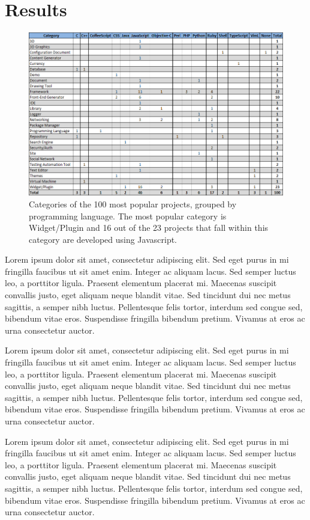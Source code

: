 
\section{Results}
\label{sec:results}
\begin{figure}[ht]
	\centering
	\includegraphics[width=\textwidth]{./img/categories.png}
	\caption{Categories of the 100 most popular projects, grouped by programming language. The most popular category is Widget/Plugin and 16 out of the 23 projects that fall within this category are developed using Javascript.}
	\label{fig:categories}
\end{figure}

Lorem ipsum dolor sit amet, consectetur adipiscing elit. Sed eget purus in mi fringilla faucibus ut sit amet enim. Integer ac aliquam lacus. Sed semper luctus leo, a porttitor ligula. Praesent elementum placerat mi. Maecenas suscipit convallis justo, eget aliquam neque blandit vitae. Sed tincidunt dui nec metus sagittis, a semper nibh luctus. Pellentesque felis tortor, interdum sed congue sed, bibendum vitae eros. Suspendisse fringilla bibendum pretium. Vivamus at eros ac urna consectetur auctor.

Lorem ipsum dolor sit amet, consectetur adipiscing elit. Sed eget purus in mi fringilla faucibus ut sit amet enim. Integer ac aliquam lacus. Sed semper luctus leo, a porttitor ligula. Praesent elementum placerat mi. Maecenas suscipit convallis justo, eget aliquam neque blandit vitae. Sed tincidunt dui nec metus sagittis, a semper nibh luctus. Pellentesque felis tortor, interdum sed congue sed, bibendum vitae eros. Suspendisse fringilla bibendum pretium. Vivamus at eros ac urna consectetur auctor.

Lorem ipsum dolor sit amet, consectetur adipiscing elit. Sed eget purus in mi fringilla faucibus ut sit amet enim. Integer ac aliquam lacus. Sed semper luctus leo, a porttitor ligula. Praesent elementum placerat mi. Maecenas suscipit convallis justo, eget aliquam neque blandit vitae. Sed tincidunt dui nec metus sagittis, a semper nibh luctus. Pellentesque felis tortor, interdum sed congue sed, bibendum vitae eros. Suspendisse fringilla bibendum pretium. Vivamus at eros ac urna consectetur auctor.

